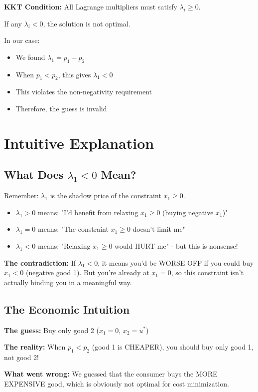 \documentclass[11pt]{article}
\begin{document}
\begin{tcolorbox}[colback=yellow!10!white,colframe=orange!75!black,title=The Rule]
\textbf{KKT Condition:} All Lagrange multipliers must satisfy $\lambda_i \geq 0$.

If any $\lambda_i < 0$, the solution is not optimal.
\end{tcolorbox}

In our case:
\begin{itemize}
\item We found $\lambda_1 = p_1 - p_2$
\item When $p_1 < p_2$, this gives $\lambda_1 < 0$
\item This violates the non-negativity requirement
\item Therefore, the guess is invalid
\end{itemize}

\section{Intuitive Explanation}

\subsection{What Does $\lambda_1 < 0$ Mean?}

Remember: $\lambda_1$ is the shadow price of the constraint $x_1 \geq 0$.

\begin{itemize}
\item $\lambda_1 > 0$ means: "I'd benefit from relaxing $x_1 \geq 0$ (buying negative $x_1$)"
\item $\lambda_1 = 0$ means: "The constraint $x_1 \geq 0$ doesn't limit me"
\item $\lambda_1 < 0$ means: "Relaxing $x_1 \geq 0$ would HURT me" - but this is nonsense!
\end{itemize}

\textbf{The contradiction:} If $\lambda_1 < 0$, it means you'd be WORSE OFF if you could buy $x_1 < 0$ (negative good 1). But you're already at $x_1 = 0$, so this constraint isn't actually binding you in a meaningful way.

\subsection{The Economic Intuition}

\begin{tcolorbox}[colback=green!5!white,colframe=green!75!black,title=Why the Guess Was Wrong]
\textbf{The guess:} Buy only good 2 ($x_1 = 0$, $x_2 = u^*$)

\textbf{The reality:} When $p_1 < p_2$ (good 1 is CHEAPER), you should buy only good 1, not good 2!

\textbf{What went wrong:} We guessed that the consumer buys the MORE EXPENSIVE good, which is obviously not optimal for cost minimization.
\end{tcolorbox}
\end{document}
